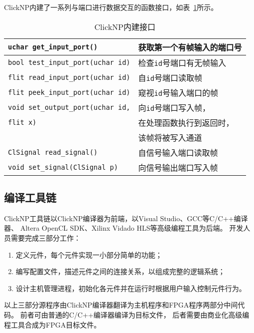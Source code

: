 ClickNP内建了一系列与端口进行数据交互的函数接口，如表~\ref{tab:operations}所示。
\begin{table}[htbp]
\centering
\caption{ClickNP内建接口} \label{tab:operations}
\begin{tabular}{l|l}
\hline
\lstinline$uchar get_input_port()$         & 获取第一个有帧输入的端口号 \\
\hline
\lstinline$bool test_input_port(uchar id)$ & 检查\lstinline$id$号端口有无帧输入 \\
\hline
\lstinline$flit read_input_port(uchar id)$ & 自\lstinline$id$号端口读取帧 \\
\hline
\lstinline$flit peek_input_port(uchar id)$ & 窥视\lstinline$id$号输入端口的帧 \\
\hline
\lstinline$void set_output_port(uchar id,$ & 向\lstinline$id$号端口写入帧， \\
\lstinline$flit x)$                        & 在处理函数执行到返回时， \\
                                           & 该帧将被写入通道 \\
\hline
\lstinline$ClSignal read_signal()$         & 自信号输入端口读取帧 \\
\hline
\lstinline$void set_signal(ClSignal p)$    & 向信号输出端口写入帧 \\
\hline

\hline
\end{tabular}
\end{table}

\subsection{编译工具链}
ClickNP工具链以ClickNP编译器为前端，以Visual Studio、GCC等C/C++编译器、
Altera OpenCL SDK、Xilinx Vidado HLS等高级编程工具为后端。
开发人员需要完成三部分工作：
\begin{enumerate}
\item 定义元件，每个元件实现一小部分简单的功能；
\item 编写配置文件，描述元件之间的连接关系，以组成完整的逻辑系统；
\item 设计主机管理进程，初始化各元件并在运行时根据用户输入控制元件行为。
\end{enumerate}

以上三部分源程序由ClickNP编译器翻译为主机程序和FPGA程序两部分中间代码。
前者可由普通的C/C++编译器编译为目标文件，
后者需要由商业化高级编程工具合成为FPGA目标文件。
